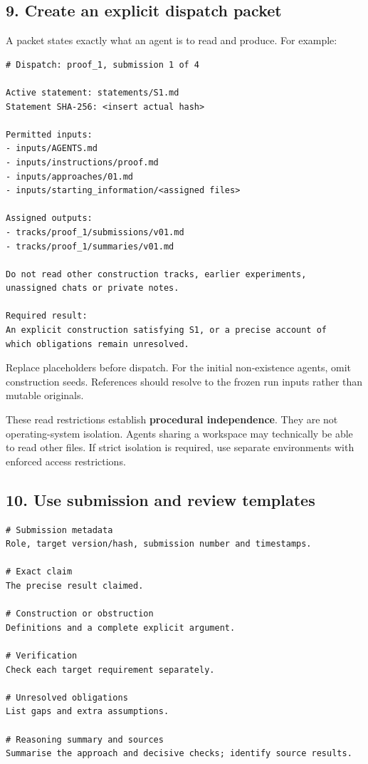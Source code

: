 \documentclass[11pt,a4paper]{article}
\begin{document}
\subsection*{9. Create an explicit dispatch packet}
A packet states exactly what an agent is to read and produce. For example:
\begin{lstlisting}
# Dispatch: proof_1, submission 1 of 4

Active statement: statements/S1.md
Statement SHA-256: <insert actual hash>

Permitted inputs:
- inputs/AGENTS.md
- inputs/instructions/proof.md
- inputs/approaches/01.md
- inputs/starting_information/<assigned files>

Assigned outputs:
- tracks/proof_1/submissions/v01.md
- tracks/proof_1/summaries/v01.md

Do not read other construction tracks, earlier experiments,
unassigned chats or private notes.

Required result:
An explicit construction satisfying S1, or a precise account of
which obligations remain unresolved.
\end{lstlisting}

Replace placeholders before dispatch. For the initial non-existence agents, omit construction seeds. References should resolve to the frozen run inputs rather than mutable originals.

These read restrictions establish \textbf{procedural independence}. They are not operating-system isolation. Agents sharing a workspace may technically be able to read other files. If strict isolation is required, use separate environments with enforced access restrictions.

\subsection*{10. Use submission and review templates}
\begin{lstlisting}
# Submission metadata
Role, target version/hash, submission number and timestamps.

# Exact claim
The precise result claimed.

# Construction or obstruction
Definitions and a complete explicit argument.

# Verification
Check each target requirement separately.

# Unresolved obligations
List gaps and extra assumptions.

# Reasoning summary and sources
Summarise the approach and decisive checks; identify source results.
\end{lstlisting}
\end{document}
